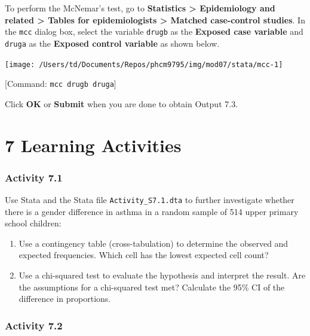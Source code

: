 \documentclass[
]{memoir}
\providecommand{\tightlist}{%
  \setlength{\itemsep}{0pt}\setlength{\parskip}{0pt}}
\begin{document}
To perform the McNemar's test, go to \textbf{Statistics \textgreater{} Epidemiology and related \textgreater{} Tables for epidemiologists \textgreater{} Matched case-control studies}. In the \texttt{mcc} dialog box, select the variable \texttt{drugb} as the \textbf{Exposed case variable} and \texttt{druga} as the \textbf{Exposed control variable} as shown below.

\texttt{[image: /Users/td/Documents/Repos/phcm9795/img/mod07/stata/mcc-1]}

{[}Command: \texttt{mcc\ drugb\ druga}{]}

Click \textbf{OK} or \textbf{Submit} when you are done to obtain Output 7.3.

\hypertarget{learning-activities-6}{%
\chapter*{\texorpdfstring{\textbf{7} Learning Activities}{7 Learning Activities}}\label{learning-activities-6}}

\hypertarget{activity-7.1}{%
\subsection*{Activity 7.1}\label{activity-7.1}}

Use Stata and the Stata file \texttt{Activity\_S7.1.dta} to further investigate whether there is a gender difference in asthma in a random sample of 514 upper primary school children:

\begin{enumerate}
\def\labelenumi{\alph{enumi})}
\tightlist
\item
  Use a contingency table (cross-tabulation) to determine the observed and expected frequencies. Which cell has the lowest expected cell count?
\item
  Use a chi-squared test to evaluate the hypothesis and interpret the result. Are the assumptions for a chi-squared test met? Calculate the 95\% CI of the difference in proportions.
\end{enumerate}

\hypertarget{activity-7.2}{%
\subsection*{Activity 7.2}\label{activity-7.2}}
\end{document}
